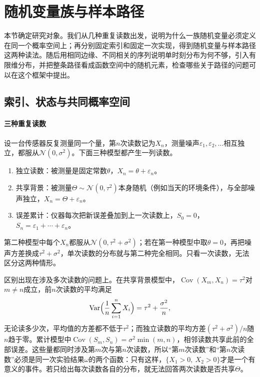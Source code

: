 
\section{随机变量族与样本路径}
\label{sec:spp-families-paths}

本节确定研究对象。我们从几种重复读数出发，说明为什么一族随机变量必须定义在同一个概率空间上；再分别固定索引和固定一次实现，得到随机变量与样本路径这两种读法。随后用相同边缘、不同相关的序列说明单时刻分布为何不够，引入有限维分布，并把整条路径看成函数空间中的随机元素，检查哪些关于路径的问题可以在这个框架中提出。

\subsection{索引、状态与共同概率空间}
\label{sec:spp-index-state-space}

\paragraph{三种重复读数}
设一台传感器反复测量同一个量，第$n$次读数记为$X_n$，测量噪声$\varepsilon_1,\varepsilon_2,\ldots$相互独立，都服从$\mathcal N(0,\sigma^2)$。下面三种模型都产生一列读数。
\begin{enumerate}
  \item 独立读数：被测量是固定常数$\theta$，$X_n=\theta+\varepsilon_n$。
  \item 共享背景：被测量$\Theta\sim\mathcal N(0,\tau^2)$本身随机（例如当天的环境条件），与全部噪声独立，$X_n=\Theta+\varepsilon_n$。
  \item 误差累计：仪器每次把新误差叠加到上一次读数上，$S_0=0$，$S_n=\varepsilon_1+\cdots+\varepsilon_n$。
\end{enumerate}
第二种模型中每个$X_n$都服从$\mathcal N(0,\tau^2+\sigma^2)$；若在第一种模型中取$\theta=0$，再把噪声方差换成$\tau^2+\sigma^2$，单次读数的分布就与第二种完全相同。只看一次读数，无法区分这两种情形。

区别出现在涉及多次读数的问题上。在共享背景模型中，$\operatorname{Cov}(X_m,X_n)=\tau^2$对$m\ne n$成立，前$n$次读数的平均满足
\[
  \operatorname{Var}\Bigl(\frac1n\sum_{i=1}^nX_i\Bigr)=\tau^2+\frac{\sigma^2}{n},
\]
无论读多少次，平均值的方差都不低于$\tau^2$；而独立读数的平均方差$(\tau^2+\sigma^2)/n$随$n$趋于零。累计模型中$\operatorname{Cov}(S_m,S_n)=\sigma^2\min(m,n)$，相邻读数共享此前的全部误差。这些量都同时涉及第$m$次与第$n$次读数，所以“第$m$次读数”和“第$n$次读数”必须是同一次实验结果$\omega$的两个函数：只有这样，$\{X_1>0,\ X_2>0\}$才是一个有意义的事件。若只给出每次读数各自的分布，就无法回答两次读数是否共享$\Theta$。

